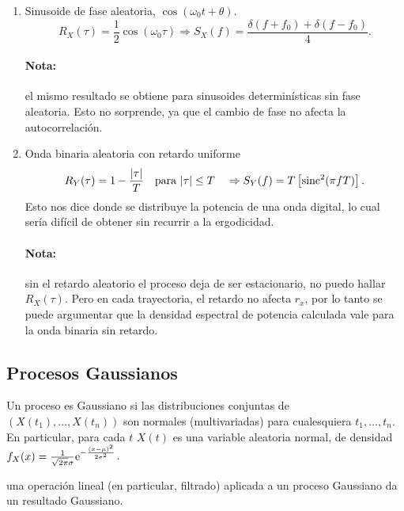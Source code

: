 \begin{enumerate}
    \item Sinusoide de fase aleatoria, $\cos(\omega_0t+\theta)$.
    \[R_X(\tau)=\frac{1}{2}\cos(\omega_0\tau)\Rightarrow S_X(f)=\frac{\delta(f+f_0)+\delta(f-f_0)}{4}.\]

    \paragraph{Nota: } el mismo resultado se obtiene para sinusoides determinísticas sin fase aleatoria. Esto no sorprende, ya que el cambio de fase no afecta la autocorrelación.

    \item Onda binaria aleatoria con retardo uniforme
    \[R_Y(\tau)=1-\frac{|\tau|}{T} \ \ \mbox{ para } |\tau|\leq T \quad \Rightarrow S_Y(f) = T\left[\operatorname{sinc}^2(\pi f T)\right].\]
    Esto nos dice donde se distribuye la potencia de una onda
    digital, lo cual sería difícil de obtener sin recurrir a la
    ergodicidad.
    \paragraph{Nota: } sin  el retardo aleatorio el proceso deja de ser estacionario, no puedo hallar $R_X(\tau)$.
    Pero en cada trayectoria, el retardo no afecta $r_x$, por lo tanto se puede argumentar que la densidad espectral de
    potencia calculada vale para la onda binaria sin retardo.
    \end{enumerate}

\subsection*{Procesos Gaussianos}

Un proceso es Gaussiano si las distribuciones conjuntas de
$\left(X(t_1),\ldots,X(t_n)\right)$ son normales (multivariadas)
para cualesquiera $t_1,\ldots,t_n$.  En particular, para cada $t$
$X(t)$ es una variable aleatoria normal, de densidad
$f_X(x)=\frac{1}{\sqrt{2\pi}\sigma}\mathrm{e}^{-\frac{(x-\mu)^2}{2\sigma^2}}$.

 una operación lineal (en particular,
filtrado) aplicada a un proceso Gaussiano da un resultado
Gaussiano.



